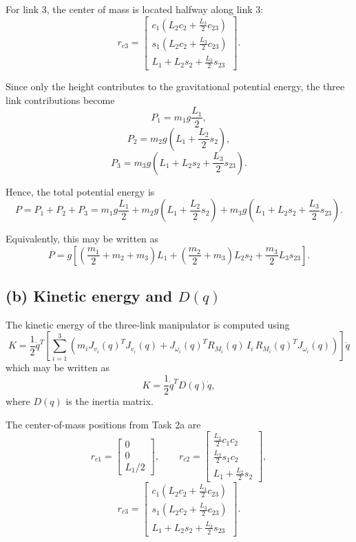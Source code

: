 \documentclass{article}
\begin{document}
For link 3, the center of mass is located halfway along link 3:
\[
r_{c3}=
\begin{bmatrix}
c_1\left(L_2 c_2+\frac{L_3}{2}c_{23}\right)\\
s_1\left(L_2 c_2+\frac{L_3}{2}c_{23}\right)\\
L_1+L_2 s_2+\frac{L_3}{2}s_{23}
\end{bmatrix}.
\]

Since only the height contributes to the gravitational potential energy, the three link contributions become
\[
P_1 = m_1 g \frac{L_1}{2},
\]
\[
P_2 = m_2 g \left(L_1+\frac{L_2}{2}s_2\right),
\]
\[
P_3 = m_3 g \left(L_1+L_2 s_2+\frac{L_3}{2}s_{23}\right).
\]

Hence, the total potential energy is
\[
P=P_1+P_2+P_3
=
m_1 g \frac{L_1}{2}
+
m_2 g \left(L_1+\frac{L_2}{2}s_2\right)
+
m_3 g \left(L_1+L_2 s_2+\frac{L_3}{2}s_{23}\right).
\]

Equivalently, this may be written as
\[
P
=
g\left[
\left(\frac{m_1}{2}+m_2+m_3\right)L_1
+
\left(\frac{m_2}{2}+m_3\right)L_2 s_2
+
\frac{m_3}{2}L_3 s_{23}
\right].
\]

\subsection*{(b) Kinetic energy and \(D(q)\)}

The kinetic energy of the three-link manipulator is computed using
\[
K =
\frac{1}{2}\dot q^T
\left[
\sum_{i=1}^{3}
\left(
m_i J_{v_i}(q)^T J_{v_i}(q)
+
J_{\omega_i}(q)^T R_{M_i}(q)\, I_i\, R_{M_i}(q)^T J_{\omega_i}(q)
\right)
\right]\dot q
\]
which may be written as
\[
K=\frac{1}{2}\dot q^T D(q)\dot q,
\]
where \(D(q)\) is the inertia matrix.

The center-of-mass positions from Task 2a are
\[
r_{c1}=
\begin{bmatrix}
0\\
0\\
L_1/2
\end{bmatrix},
\qquad
r_{c2}=
\begin{bmatrix}
\frac{L_2}{2}c_1c_2\\
\frac{L_2}{2}s_1c_2\\
L_1+\frac{L_2}{2}s_2
\end{bmatrix},
\]
\[
r_{c3}=
\begin{bmatrix}
c_1\left(L_2c_2+\frac{L_3}{2}c_{23}\right)\\
s_1\left(L_2c_2+\frac{L_3}{2}c_{23}\right)\\
L_1+L_2s_2+\frac{L_3}{2}s_{23}
\end{bmatrix}.
\]
\end{document}
